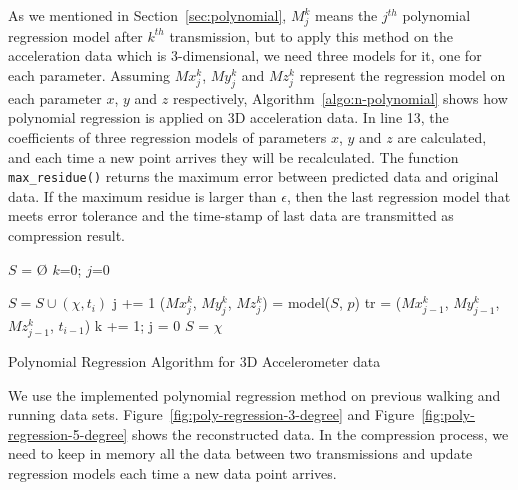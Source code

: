 As we mentioned in Section~\ref{sec:polynomial}, $M_{j}^{k}$ means the $j^{th}$
polynomial regression model after $k^{th}$ transmission, but to apply this
method on the acceleration data which is 3-dimensional, we need three models for
it, one for each parameter. Assuming $Mx_{j}^{k}$, $My_{j}^{k}$ and $Mz_{j}^{k}$
represent the regression model on each parameter $x$, $y$ and $z$ respectively,
Algorithm~\ref{algo:n-polynomial} shows how polynomial regression is applied on
3D acceleration data. In line 13, the coefficients of three regression models of
parameters $x$, $y$ and $z$ are calculated, and each time a new point arrives
they will be recalculated. The function \texttt{max\_residue()} returns the
maximum error between predicted data and original data. If the maximum residue
is larger than $\epsilon$, then the last regression model that meets error
tolerance and the time-stamp of last data are transmitted as compression result.
\begin{algorithm}
\begin{algorithmic}[1]
\Input
\EndInput
\Output
\EndOutput
\State $S$ = $\text{\O}$
\State $k$=0; $j$=0

    \State $S = S \cup (\chi, t_i)$
        \State j += 1
        \State ($Mx_{j}^{k}$, $My_{j}^{k}$, $Mz_{j}^{k}$) = model($S$, $p$)    
            \State tr = ($Mx_{j-1}^{k}$, $My_{j-1}^{k}$, $Mz_{j-1}^{k}$, $t_{i-1}$)
            \State k += 1; j = 0
            \State $S$ = $\chi$
        \EndIf
    \EndIf
\EndWhile

\end{algorithmic}
\caption{Polynomial Regression Algorithm for 3D Accelerometer data}
\label{algo:n-polynomial}
\end{algorithm}

We use the implemented polynomial regression method on previous walking and
running data sets. Figure~\ref{fig:poly-regression-3-degree} and
Figure~\ref{fig:poly-regression-5-degree} shows the reconstructed data. In the
compression process, we need to keep in memory all the data between two
transmissions and update regression models each time a new data point arrives.

